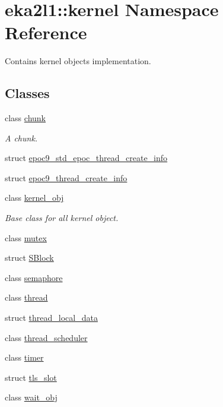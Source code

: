 \hypertarget{namespaceeka2l1_1_1kernel}{}\section{eka2l1\+:\+:kernel Namespace Reference}
\label{namespaceeka2l1_1_1kernel}


Contains kernel objects implementation.  


\subsection*{Classes}
\begin{DoxyCompactItemize}
\item 
class \mbox{\hyperlink{classeka2l1_1_1kernel_1_1chunk}{chunk}}
\begin{DoxyCompactList}\small\item\em A chunk. \end{DoxyCompactList}\item 
struct \mbox{\hyperlink{structeka2l1_1_1kernel_1_1epoc9__std__epoc__thread__create__info}{epoc9\+\_\+std\+\_\+epoc\+\_\+thread\+\_\+create\+\_\+info}}
\item 
struct \mbox{\hyperlink{structeka2l1_1_1kernel_1_1epoc9__thread__create__info}{epoc9\+\_\+thread\+\_\+create\+\_\+info}}
\item 
class \mbox{\hyperlink{classeka2l1_1_1kernel_1_1kernel__obj}{kernel\+\_\+obj}}
\begin{DoxyCompactList}\small\item\em Base class for all kernel object. \end{DoxyCompactList}\item 
class \mbox{\hyperlink{classeka2l1_1_1kernel_1_1mutex}{mutex}}
\item 
struct \mbox{\hyperlink{structeka2l1_1_1kernel_1_1_s_block}{S\+Block}}
\item 
class \mbox{\hyperlink{classeka2l1_1_1kernel_1_1semaphore}{semaphore}}
\item 
class \mbox{\hyperlink{classeka2l1_1_1kernel_1_1thread}{thread}}
\item 
struct \mbox{\hyperlink{structeka2l1_1_1kernel_1_1thread__local__data}{thread\+\_\+local\+\_\+data}}
\item 
class \mbox{\hyperlink{classeka2l1_1_1kernel_1_1thread__scheduler}{thread\+\_\+scheduler}}
\item 
class \mbox{\hyperlink{classeka2l1_1_1kernel_1_1timer}{timer}}
\item 
struct \mbox{\hyperlink{structeka2l1_1_1kernel_1_1tls__slot}{tls\+\_\+slot}}
\item 
class \mbox{\hyperlink{classeka2l1_1_1kernel_1_1wait__obj}{wait\+\_\+obj}}
\end{DoxyCompactItemize}
